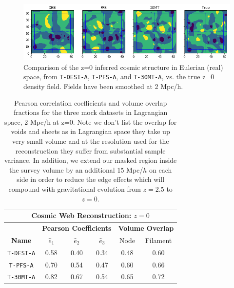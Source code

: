 \documentclass[times]{aastex62}
\begin{document}
\begin{figure}
  \centering  \includegraphics[trim=0cm 0cm 0cm 0cm,width=1.0\textwidth]{./figs_treepm/cs_z=0.png}
    \caption{Comparison of the z=0 inferred cosmic structure in Eulerian (real) space, from \texttt{T-DESI-A}, \texttt{T-PFS-A}, and \texttt{T-30MT-A}, vs. the true z=0 density field. Fields have been smoothed at 2 Mpc/h.} 
    \label{fig_cs_z=0}
\end{figure}


\begin{table}
  \begin{center}
    \label{tab:cs_z=0}
    \begin{tabular}{c||c|c|c||c|c} 
    
\multicolumn{6}{c}{\textbf{Cosmic Web Reconstruction: $z=0$}}
 \\ 
          \hline
      \hline

& \multicolumn{3}{c}{\textbf{Pearson Coefficients}} & \multicolumn{2}{|c}{\textbf{Volume Overlap}} 
 \\ 
      \hline
      \textbf{Name}& $\hat{e}_1$ &  $\hat{e}_2$ & $\hat{e}_3$ & Node & Filament\\
      \hline
      \hline


        \texttt{T-DESI-A} & 0.58 & 0.40 & 0.34 & 0.48 & 0.60\\
        \texttt{T-PFS-A} & 0.70 & 0.54 & 0.47 & 0.60 & 0.66\\
        \texttt{T-30MT-A}  & 0.82 & 0.67 & 0.54 & 0.65 & 0.72\\
    \end{tabular}
        \caption{Pearson correlation coefficients and volume overlap fractions for the three mock datasets in Lagrangian space, 2 Mpc/h at z=0. Note we don't list the overlap for voids and sheets as in Lagrangian space they take up very small volume and at the resolution used for the reconstruction they suffer from substantial sample variance. In addition, we extend our masked region inside the survey volume by an additional 15 Mpc/$h$ on each side in order to reduce the edge effects which will compound with gravitational evolution from $z=2.5$ to $z=0$.}

  \end{center}
\end{table}
\end{document}
